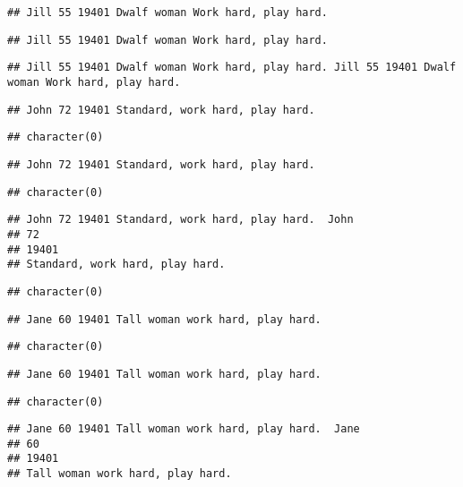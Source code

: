 \documentclass[
]{article}
\begin{document}
\begin{verbatim}
## Jill 55 19401 Dwalf woman Work hard, play hard.
\end{verbatim}

\begin{verbatim}
## Jill 55 19401 Dwalf woman Work hard, play hard.
\end{verbatim}

\begin{verbatim}
## Jill 55 19401 Dwalf woman Work hard, play hard. Jill 55 19401 Dwalf woman Work hard, play hard.
\end{verbatim}

\begin{verbatim}
## John 72 19401 Standard, work hard, play hard.
\end{verbatim}

\begin{verbatim}
## character(0)
\end{verbatim}

\begin{verbatim}
## John 72 19401 Standard, work hard, play hard.
\end{verbatim}

\begin{verbatim}
## character(0)
\end{verbatim}

\begin{verbatim}
## John 72 19401 Standard, work hard, play hard.  John 
## 72 
## 19401 
## Standard, work hard, play hard.
\end{verbatim}

\begin{verbatim}
## character(0)
\end{verbatim}

\begin{verbatim}
## Jane 60 19401 Tall woman work hard, play hard.
\end{verbatim}

\begin{verbatim}
## character(0)
\end{verbatim}

\begin{verbatim}
## Jane 60 19401 Tall woman work hard, play hard.
\end{verbatim}

\begin{verbatim}
## character(0)
\end{verbatim}

\begin{verbatim}
## Jane 60 19401 Tall woman work hard, play hard.  Jane 
## 60 
## 19401 
## Tall woman work hard, play hard.
\end{verbatim}
\end{document}
